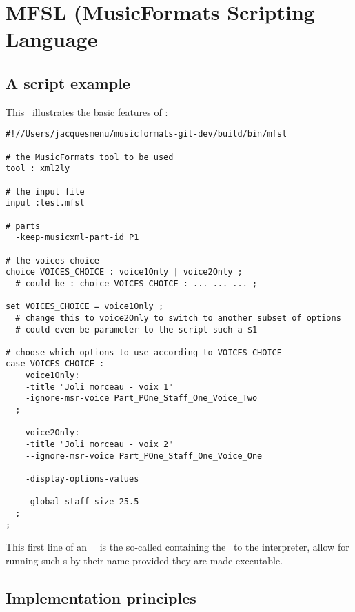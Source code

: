 
\chapter{MFSL (MusicFormats Scripting Language}

\section{A script example}

This \script\ illustrates the basic features of \mfslLang:
\begin{lstlisting}[language=MFSL]
#!//Users/jacquesmenu/musicformats-git-dev/build/bin/mfsl

# the MusicFormats tool to be used
tool : xml2ly

# the input file
input :test.mfsl

# parts
  -keep-musicxml-part-id P1

# the voices choice
choice VOICES_CHOICE : voice1Only | voice2Only ;
  # could be : choice VOICES_CHOICE : ... ... ... ;

set VOICES_CHOICE = voice1Only ;
  # change this to voice2Only to switch to another subset of options
  # could even be parameter to the script such a $1

# choose which options to use according to VOICES_CHOICE
case VOICES_CHOICE :
	voice1Only:
    -title "Joli morceau - voix 1"
    -ignore-msr-voice Part_POne_Staff_One_Voice_Two
  ;

	voice2Only:
    -title "Joli morceau - voix 2"
    --ignore-msr-voice Part_POne_Staff_One_Voice_One

    -display-options-values

    -global-staff-size 25.5
  ;
;
\end{lstlisting}

This first line of an \mfslLang\ \script\ is the so-called  containing the \filePath\ to the interpreter, allow for running such \script s by their name provided they are made executable.


\section{Implementation principles}

